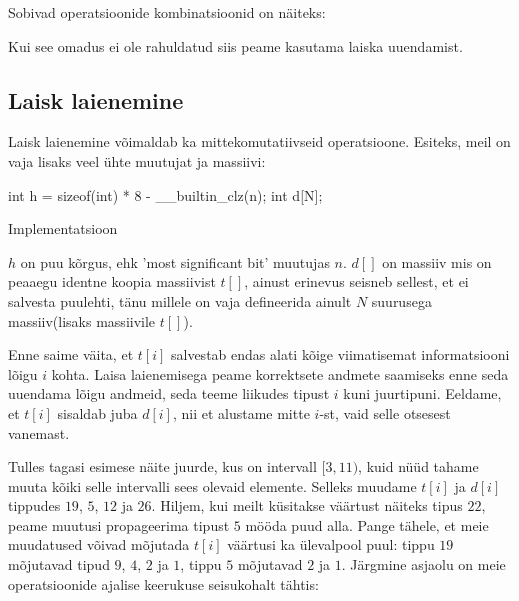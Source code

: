 \documentclass{trkut}
\begin{document}
Sobivad operatsioonide kombinatsioonid on näiteks:
\begin{table}[H]
\caption{Sobivad operatsioonid}%
\label{tabel2}%
\end{table}

Kui see omadus ei ole rahuldatud siis peame kasutama laiska uuendamist.
\subsection{Laisk laienemine} 
Laisk laienemine võimaldab ka mittekomutatiivseid operatsioone.
Esiteks, meil on vaja lisaks veel ühte muutujat ja massiivi:
\begin{cclol}
int h = sizeof(int) * 8 - __builtin_clz(n);
int d[N];  
\end{cclol}
\begin{kk}[H]%
    \caption{Implementatsioon}%
    \label{CPH}%
    \end{kk}
$h$ on puu kõrgus, ehk 'most significant bit' muutujas $n$. $d[]$ on massiiv mis on peaaegu identne koopia massiivist $t[]$, ainust erinevus seisneb sellest, et ei salvesta puulehti, tänu millele on vaja defineerida ainult $N$ suurusega massiiv(lisaks massiivile $t[]$).

Enne saime väita, et $t[i]$ salvestab endas alati kõige viimatisemat informatsiooni lõigu $i$ kohta. Laisa laienemisega peame korrektsete andmete saamiseks enne seda uuendama lõigu andmeid, seda teeme liikudes tipust $i$ kuni juurtipuni. Eeldame, et $t[i]$ sisaldab juba $d[i]$, nii et alustame mitte $i$-st, vaid selle otsesest vanemast.

Tulles tagasi esimese näite juurde, kus on intervall $[3, 11)$, kuid nüüd tahame muuta kõiki selle intervalli sees olevaid elemente. Selleks muudame $t[i]$ ja $d[i]$ tippudes $19$, $5$, $12$ ja $26$. Hiljem, kui meilt küsitakse väärtust näiteks tipus $22$, peame muutusi propageerima tipust $5$ mööda puud alla. Pange tähele, et meie muudatused võivad mõjutada $t[i]$ väärtusi ka ülevalpool puul: tippu $19$ mõjutavad tipud $9$, $4$, $2$ ja $1$, tippu $5$ mõjutavad $2$ ja $1$. Järgmine asjaolu on meie operatsioonide ajalise keerukuse seisukohalt tähtis:
\end{document}
